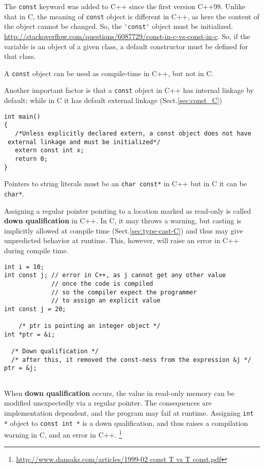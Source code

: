 The \verb!const! keyword was added to C++ since the first version C++98. Unlike
that in C, the meaning of \verb!const! object is different in C++, as here the
content of the object cannot be changed. So, the \verb!'const'! object must be
initialized.
\url{http://stackoverflow.com/questions/6087729/const-in-c-vs-const-in-c}. So,
if the variable is an object of a given class, a default constructor must be
defined for that class.

A \verb!const! object can be used as compile-time in C++, but not in C.

Another important factor is that a \verb!const! object in C++ has internal
linkage by default; while in C it has default external linkage
(Sect.\ref{sec:const_C})
\begin{verbatim}
int main()
{
   /*Unless explicitly declared extern, a const object does not have
 external linkage and must be initialized*/
   extern const int x; 
   return 0;
}
\end{verbatim}

Pointers to string literals must be an \verb!char const*! in C++ but in C it can
be \verb!char*!.

Assigning a regular pointer pointing to a location marked as read-only is called
{\bf down qualification} in C++. In C, it may throws a warning, but casting is
implicitly allowed at compile time (Sect.\ref{sec:type-cast-C}) and thus may
give unpredicted behavior at runtime. This, however, will raise an error in C++
during compile time.

\begin{Verbatim}
int i = 10;
int const j; // error in C++, as j cannot get any other value
             // once the code is compiled
             // so the compiler expect the programmer 
             // to assign an explicit value
int const j = 20;
 
    /* ptr is pointing an integer object */
int *ptr = &i; 

  /* Down qualification */
  /* after this, it removed the const-ness from the expression &j */
ptr = &j;    
    
\end{Verbatim}
When {\bf down qualification} occurs, the value in read-only memory can be
modified unexpectedly via a regular pointer. The consequences are implementation
dependent, and the program may fail at runtime.  Assigning \verb!int *! object
to \verb!const int *! is a down qualification, and thus raises a compilation
warning in C, and an error in C++.
\footnote{\url{http://www.dansaks.com/articles/1999-02 const T vs T const.pdf}}


